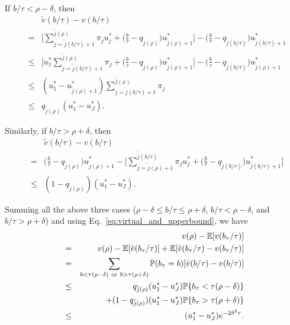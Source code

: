 If $b/\tau < \rho - \delta$, then
\begin{eqnarray} \label{eq:single_step_gap_left}
&&\tilde{v}(b/\tau) -  v(b/\tau) \nonumber \\
&=&  \bigg[ \sum_{j = \tilde{j}(b/\tau)  +1 }^{\tilde{j}(\rho)} \pi_j u_j^*
+ \big(\frac{b}{\tau} - q_{ \tilde{j}(\rho)}\big) u_{\tilde{j}(\rho) + 1}^*  \bigg]  - \big(\frac{b}{\tau} - q_{ \tilde{j}(b/\tau)}\big) u_{\tilde{j}(b/\tau)  +1}^* \nonumber \\
&\leq &  \bigg[ u_1^* \sum_{j = \tilde{j}(b/\tau)  +1 }^{\tilde{j}(\rho)} \pi_j
+ \big(\frac{b}{\tau} - q_{ \tilde{j}(\rho)}\big) u_{\tilde{j}(\rho) + 1}^*  \bigg]  - \big(\frac{b}{\tau} - q_{ \tilde{j}(b/\tau)   }\big) u_{\tilde{j}(\rho) + 1}^* \nonumber \\
&\leq& (u_1^* - u_{\tilde{j}(\rho) + 1}^*)\sum_{j = \tilde{j}(b/\tau)  +1 }^{\tilde{j}(\rho)} \pi_j     \nonumber \\
&\leq & q_{\tilde{j}(\rho)}(u_1^* -  u_J^*).
\end{eqnarray}

Similarly, if $b/\tau > \rho + \delta$, then
\begin{eqnarray} \label{eq:single_step_gap_right}
&& \tilde{v}(b/\tau) -  v(b/\tau) \nonumber \\
 &=&
\big(\frac{b}{\tau} - q_{ \tilde{j}(\rho)}\big) u_{\tilde{j}(\rho) +1}^* - \bigg[ \sum_{j = \tilde{j}(\rho)+1}^{\tilde{j}(b/\tau)} \pi_j u_j^* + \big(\frac{b}{\tau} - q_{ \tilde{j}(b/\tau) }\big) u_{\tilde{j}(b/\tau)+1}^*  \bigg] \nonumber \\
&\leq& (1 - q_{\tilde{j}(\rho)}) (u_1^* - u_J^*).
\end{eqnarray}

Summing all the above three cases ($\rho - \delta \leq b/\tau \leq \rho + \delta$, $b/\tau < \rho - \delta$, and $b/\tau > \rho + \delta$) and using Eq.~\eqref{eq:virtual_and_upperbound}, we have
\begin{eqnarray} \label{eq:virtual_and_alp}
&&v(\rho) - \mathbb{E}[v(b_\tau/\tau)] \nonumber\\
&=& v(\rho)- \mathbb{E}[\tilde{v}(b_\tau/\tau)] + \mathbb{E}[\tilde{v}(b_\tau/\tau) - v(b_\tau/\tau)]  \nonumber\\
& =&  \sum_{ b < \tau(\rho - \delta)~{\rm or}~b >\tau(\rho + \delta)} \mathbb{P}(b_\tau = b)[\tilde{v}(b/\tau) -v(b/\tau)] \nonumber\\
&\leq & q_{\tilde{j}(\rho)}(u_1^* - u_J^*) \mathbb{P}\{b_{\tau} < \tau(\rho - \delta)\} \nonumber \\
&&+ (1-q_{\tilde{j}(\rho)}) (u_1^* - u_J^*) \mathbb{P}\{b_{\tau} > \tau(\rho + \delta)\}     \nonumber \\
&\leq & (u_1^* - u_J^*) e^{-2\delta^2\tau}.
\end{eqnarray}

